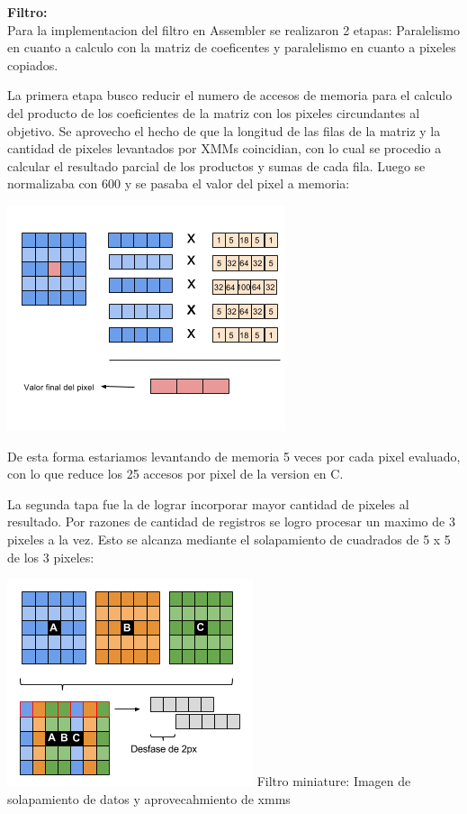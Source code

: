 \textbf{Filtro:}
\\
Para la implementacion del filtro en Assembler se realizaron 2 etapas: Paralelismo en cuanto a calculo con la matriz de coeficentes y paralelismo en cuanto a pixeles copiados.
\par
\bigskip
La primera etapa busco reducir el numero de accesos de memoria para el calculo del producto de los coeficientes de la matriz con los pixeles circundantes al objetivo. Se aprovecho el hecho de que la longitud de las filas de la matriz y la cantidad de pixeles levantados por XMMs coincidian, con lo cual se procedio a calcular el resultado parcial de los productos y sumas de cada fila. Luego se normalizaba con 600 y se pasaba el valor del pixel a memoria:

\includegraphics[scale=0.7]{imagenes/version1-miniature.png} 

De esta forma estariamos levantando de memoria 5 veces por cada pixel evaluado, con lo que reduce los 25 accesos por pixel de la version en C.

La segunda tapa fue la de lograr incorporar mayor cantidad de pixeles al resultado. Por razones de cantidad de registros se logro procesar un maximo de 3 pixeles a la vez. Esto se alcanza mediante el solapamiento de cuadrados de 5 x 5 de los 3 pixeles:

\includegraphics[scale=0.7]{imagenes/solapamiento-cuadros.png}  Filtro miniature: Imagen de solapamiento de datos y aprovecahmiento de xmms

